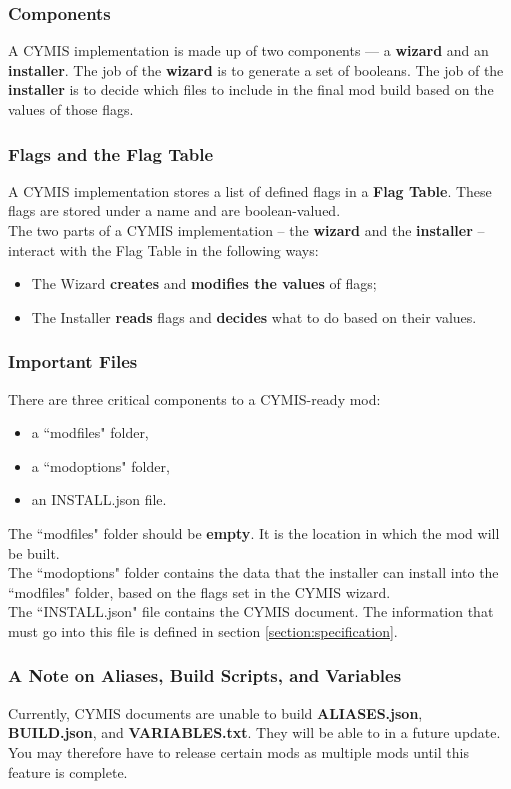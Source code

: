\documentclass{article}
\begin{document}
\subsubsection{Components}
A CYMIS implementation is made up of two components --- a \textbf{wizard} and an \textbf{installer}. The job of the \textbf{wizard} is to generate a set of booleans. The job of the \textbf{installer} is to decide which files to include in the final mod build based on the values of those flags.

\subsubsection{Flags and the Flag Table}
A CYMIS implementation stores a list of defined flags in a \textbf{Flag Table}. These flags are stored under a name and are boolean-valued.\\
The two parts of a CYMIS implementation -- the \textbf{wizard} and the \textbf{installer} -- interact with the Flag Table in the following ways:
\begin{itemize}
\item The Wizard \textbf{creates} and \textbf{modifies the values} of flags;
\item The Installer \textbf{reads} flags and \textbf{decides} what to do based on their values.
\end{itemize}

\subsubsection{Important Files}
There are three critical components to a CYMIS-ready mod:
\begin{itemize}
\item a ``modfiles" folder,
\item a ``modoptions" folder,
\item an INSTALL.json file.
\end{itemize}
The ``modfiles" folder should be \textbf{empty}. It is the location in which the mod will be built.\\
The ``modoptions" folder contains the data that the installer can install into the ``modfiles" folder, based on the flags set in the CYMIS wizard.\\
The ``INSTALL.json" file contains the CYMIS document. The information that must go into this file is defined in section \ref{section:specification}.

\subsubsection{A Note on Aliases, Build Scripts, and Variables}
Currently, CYMIS documents are unable to build \textbf{ALIASES.json}, \textbf{BUILD.json}, and \textbf{VARIABLES.txt}. They will be able to in a future update. You may therefore have to release certain mods as multiple mods until this feature is complete.
\end{document}
